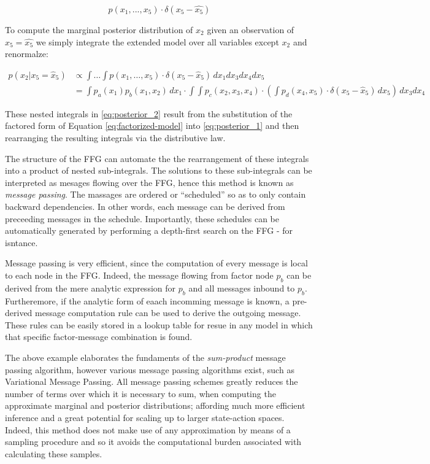 \documentclass[onecolumn]{IEEEtran}
\begin{document}
$$ p(x_1, ..., x_5) \cdot \delta(x_5 - \hat{x_5})$$ 

To compute the marginal posterior distribution of $x_2$ given an observation of $x_5 = \hat{x_5}$ we simply integrate the extended model over all variables except $x_2$ and renormalze:

\begin{align}
	p(x_2 | x_5 = \hat{x}_5) &\propto \int \dots \int p(x_1, \dots, x_5) \cdot \delta(x_5 - \hat{x}_5) \, dx_1 dx_3 dx_4 dx_5 \label{eq:posterior_1} \\
	&= \int p_a(x_1) p_b(x_1, x_2) \, dx_1 \cdot \int\int p_c(x_2, x_3, x_4) \cdot \left(\int p_d(x_4, x_5) \cdot \delta(x_5 - \hat{x}_5) \, dx_5 \right) \, dx_3 dx_4 \label{eq:posterior_2}
\end{align}


These nested integrals in \eqref{eq:posterior_2} result from the substitution of the factored form of Equation \ref{eq:factorized-model} into \eqref{eq:posterior_1} and then rearranging the resulting integrals via the distributive law.

The structure of the FFG can automate the the rearrangement of these integrals into a product of nested sub-integrals. The solutions to these sub-integrals can be interpreted as mesages flowing over the FFG, hence this method is known as \textit{message passing}. The massages are ordered or ``scheduled'' so as to only contain backward dependencies. In other words, each message can be derived from preceeding messages in the schedule. Importantly, these schedules can be automatically generated by performing a depth-first search on the FFG - for isntance. 

Message passing is very efficient, since the computation of every message is local to each node in the FFG. Indeed, the message flowing from factor node $p_b$ can be derived from the mere analytic expression for $p_b$ and all messages inbound to $p_b$. Furtheremore, if the analytic form of eaach incomming message is known, a pre-derived message computation rule can be used to derive the outgoing message. These rules can be easily stored in a lookup table for resue in any model in which that specific factor-message combination is found. 

The above example elaborates the fundaments of the \textit{sum-product} message passing algorithm, however various message passing algorithms exist, such as Variational Message Passing. All message passing schemes greatly reduces the number of terms over which it is necessary to sum, when computing the approximate marginal and posterior distributions; affording much more efficient inference and a great potential for scaling up to larger state-action spaces. Indeed, this method does not make use of any approximation by means of a sampling procedure and so it avoids the computational burden associated with calculating these samples. 
\end{document}

